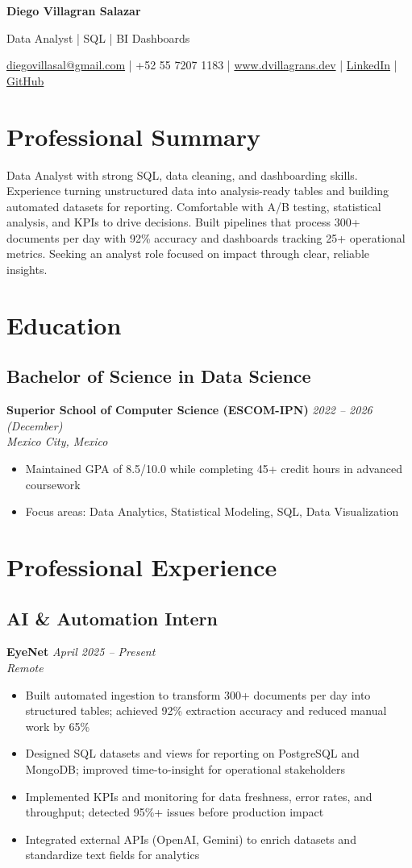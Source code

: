 \documentclass[7.5pt,a4paper]{article}
\newcommand{\name}[1]{\begin{center}\Large\bfseries\color{HarvardCrimson}#1\end{center}}
\newcommand{\tagline}[1]{\begin{center}\normalsize\color{DarkGray}#1\end{center}}
\newcommand{\contactinfo}[1]{\begin{center}\small\color{MediumGray}#1\end{center}}
\newcommand{\experience}[4]{\subsection*{#1}\textbf{#2} \hfill \textit{#3} \\\textit{#4}}
\newcommand{\education}[4]{\subsection*{#1}\textbf{#2} \hfill \textit{#3} \\\textit{#4}}
\begin{document}
\name{Diego Villagran Salazar}
\tagline{Data Analyst | SQL | BI Dashboards}
\contactinfo{\href{mailto:diegovillasal@gmail.com}{diegovillasal@gmail.com} | +52 55 7207 1183 | \href{https://www.dvillagrans.dev}{www.dvillagrans.dev} | \href{https://www.linkedin.com/in/dvillagrans}{LinkedIn} | \href{https://github.com/dvillagrans}{GitHub}}

\vspace{0.01cm}

\section*{Professional Summary}
\small
Data Analyst with strong SQL, data cleaning, and dashboarding skills. Experience turning unstructured data into analysis-ready tables and building automated datasets for reporting. Comfortable with A/B testing, statistical analysis, and KPIs to drive decisions. Built pipelines that process 300+ documents per day with 92\% accuracy and dashboards tracking 25+ operational metrics. Seeking an analyst role focused on impact through clear, reliable insights.

\vspace{0.01cm}

\section*{Education}
\education{Bachelor of Science in Data Science}{Superior School of Computer Science (ESCOM-IPN)}{2022 -- 2026 (December)}{Mexico City, Mexico}
\begin{itemize}
\item Maintained GPA of 8.5/10.0 while completing 45+ credit hours in advanced coursework
\item Focus areas: Data Analytics, Statistical Modeling, SQL, Data Visualization
\end{itemize}

\section*{Professional Experience}

\experience{AI \& Automation Intern}{EyeNet}{April 2025 -- Present}{Remote}
\begin{itemize}
\item Built automated ingestion to transform 300+ documents per day into structured tables; achieved 92\% extraction accuracy and reduced manual work by 65\%
\item Designed SQL datasets and views for reporting on PostgreSQL and MongoDB; improved time-to-insight for operational stakeholders
\item Implemented KPIs and monitoring for data freshness, error rates, and throughput; detected 95\%+ issues before production impact
\item Integrated external APIs (OpenAI, Gemini) to enrich datasets and standardize text fields for analytics
\end{itemize}
\end{document}
